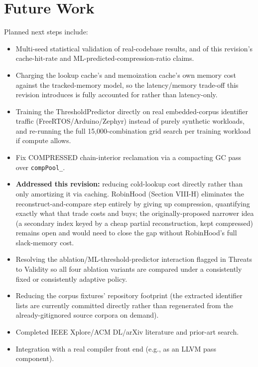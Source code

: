 \documentclass[conference]{IEEEtran}
\begin{document}
\section{Future Work}
Planned next steps include:
\begin{itemize}
\item Multi-seed statistical validation of real-codebase results, and of
  this revision's cache-hit-rate and ML-predicted-compression-ratio claims.
\item Charging the lookup cache's and memoization cache's own memory cost
  against the tracked-memory model, so the latency/memory trade-off this
  revision introduces is fully accounted for rather than latency-only.
\item Training the ThresholdPredictor directly on real embedded-corpus
  identifier traffic (FreeRTOS/Arduino/Zephyr) instead of purely synthetic
  workloads, and re-running the full 15,000-combination grid search per
  training workload if compute allows.
\item Fix COMPRESSED chain-interior reclamation via a compacting GC pass
  over \texttt{compPool\_}.
\item \textbf{Addressed this revision:} reducing cold-lookup cost directly
  rather than only amortizing it via caching. RobinHood (Section VIII-H)
  eliminates the reconstruct-and-compare step entirely by giving up
  compression, quantifying exactly what that trade costs and buys; the
  originally-proposed narrower idea (a secondary index keyed by a cheap
  partial reconstruction, kept compressed) remains open and would need to
  close the gap without RobinHood's full slack-memory cost.
\item Resolving the ablation/ML-threshold-predictor interaction flagged in
  Threats to Validity so all four ablation variants are compared under a
  consistently fixed or consistently adaptive policy.
\item Reducing the corpus fixtures' repository footprint (the extracted
  identifier lists are currently committed directly rather than
  regenerated from the already-gitignored source corpora on demand).
\item Completed IEEE Xplore/ACM DL/arXiv literature and prior-art search.
\item Integration with a real compiler front end (e.g., as an LLVM pass
  component).
\end{itemize}
\end{document}
